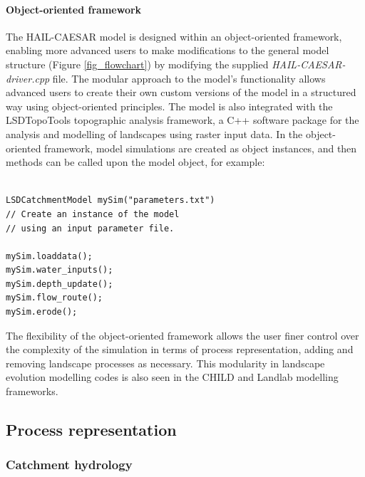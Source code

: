 \paragraph*{Object-oriented framework}
The HAIL-CAESAR model is designed within an object-oriented framework, enabling more advanced users to make modifications to the general model structure (Figure \ref{fig_flowchart}) by modifying the supplied \textit{HAIL-CAESAR-driver.cpp} file. The modular approach to the model's functionality allows advanced users to create their own custom versions of the model in a structured way using object-oriented principles. The model is also integrated with the LSDTopoTools topographic analysis framework, a C++ software package for the analysis and modelling of landscapes using raster input data. In the object-oriented framework, model simulations are created as object instances, and then methods can be called upon the model object, for example:

\begin{verbatim}

LSDCatchmentModel mySim("parameters.txt")
// Create an instance of the model 
// using an input parameter file.

mySim.loaddata();
mySim.water_inputs(); 
mySim.depth_update(); 
mySim.flow_route(); 
mySim.erode(); 

\end{verbatim} 

The flexibility of the object-oriented framework allows the user finer control over the complexity of the simulation in terms of process representation, adding and removing landscape processes as necessary. This modularity in landscape evolution modelling codes is also seen in the CHILD \citep{Tucker2001} and Landlab \citep{hobley10creative} modelling frameworks.
%

\subsection{Process representation}

\subsubsection{Catchment hydrology}

